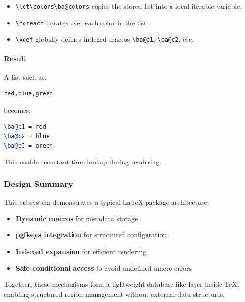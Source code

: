 \begin{itemize}
\item \verb|\let\colors\ba@colors| copies the stored list into a local iterable variable.
\item \verb|\foreach| iterates over each color in the list.
\item \verb|\xdef| globally defines indexed macros \verb|\ba@c1|, \verb|\ba@c2|, etc.
\end{itemize}

\paragraph{Result}

A list such as:

\begin{lstlisting}[language=LaTeX]
red,blue,green
\end{lstlisting}

becomes:

\begin{lstlisting}[language=LaTeX]
\ba@c1 = red
\ba@c2 = blue
\ba@c3 = green
\end{lstlisting}

This enables constant-time lookup during rendering.



\subsubsection{Design Summary}

This subsystem demonstrates a typical LaTeX package architecture:

\begin{itemize}
\item \textbf{Dynamic macros} for metadata storage
\item \textbf{pgfkeys integration} for structured configuration
\item \textbf{Indexed expansion} for efficient rendering
\item \textbf{Safe conditional access} to avoid undefined macro errors
\end{itemize}

Together, these mechanisms form a lightweight database-like layer inside TeX, enabling structured region management without external data structures.